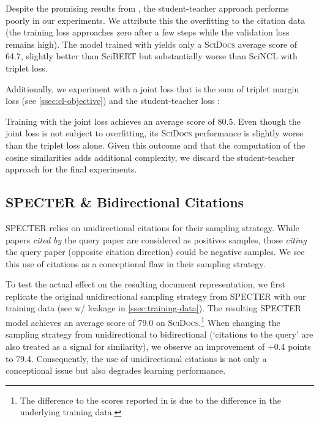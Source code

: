 \documentclass[11pt]{article}
\newcommand{\dataset}{\textsc{SciDocs}\xspace}
\newcommand{\sys}{SciNCL\xspace} \newcommand{\baselineCount}{10\xspace}
\begin{document}
Despite the promising results from \citet{Tian2020}, the student-teacher approach performs poorly in our experiments.
We attribute this the overfitting to the citation data (the training loss approaches zero after a few steps while the validation loss remains high).
The model trained with  yields only a \dataset average score of 64.7, slightly better than SciBERT but substantially worse than \sys with triplet loss.

Additionally, we experiment with a joint loss that is the sum of triplet margin loss  (see \cref{ssec:cl-objective}) and the student-teacher loss :



Training with the joint loss  achieves an average score of 80.5. 
Even though the joint loss is not subject to overfitting, its \dataset performance is slightly worse than the triplet loss  alone.
Given this outcome and that the computation of the cosine similarities adds additional complexity, we discard the student-teacher approach for the final experiments.

\subsection{SPECTER \& Bidirectional Citations} \label{sssec:bi-specter}

SPECTER \citep{Cohan2020} relies on unidirectional citations for their sampling strategy.
While papers \textit{cited by} the query paper are considered as positives samples, those \textit{citing} the query paper (opposite citation direction) could be negative samples.
We see this use of citations as a conceptional flaw in their sampling strategy.

To test the actual effect on the resulting document representation, we first replicate the original unidirectional sampling strategy from SPECTER with our training data (see w/ leakage in \cref{ssec:training-data}). 
The resulting SPECTER model achieves an average score of 79.0 on \dataset.\footnote{The difference to the scores reported in \citet{Cohan2020} is due to the difference in the underlying training data.}
When changing the sampling strategy from unidirectional to bidirectional (`citations to the query' are also treated as a signal for similarity), we observe an improvement of +0.4 points to 79.4.
Consequently, the use of unidirectional citations is not only a conceptional issue but also degrades learning performance.
\end{document}
